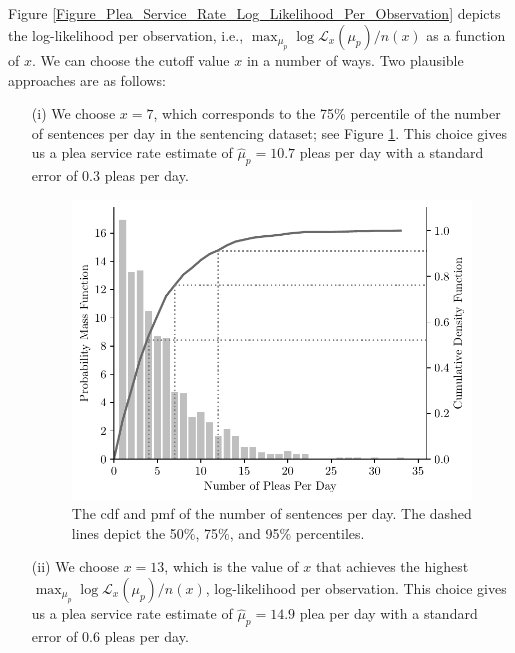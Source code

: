 \documentclass[11pt, oneside]{article}   	%
\theoremstyle{ModifiedStyle}
\begin{document}
%
Figure \ref{Figure_Plea_Service_Rate_Log_Likelihood_Per_Observation} depicts the log-likelihood per observation, i.e., $\max_{\mu_p} \log \mathcal{L}_x(\mu_p)/n(x)$ as a function of $x$. We can choose the cutoff value $x$ in a number of ways. Two plausible approaches are as follows:
\begin{itemize}
	\vspace{-1mm}
	\item[(i)] We choose $x = 7$, which corresponds to the 75\% percentile of the number of sentences per day in the sentencing dataset; see Figure \ref{Figure_Sentences_Per_Day_Histogram}. This choice gives us a plea service rate estimate of $\hat{\mu}_p = 10.7$ pleas per day with a standard error of $0.3$ pleas per day.
	\vspace{-1mm}
	\begin{figure}[H]
		\centering
		\includegraphics[scale=0.75]{Figures/Histogram_Pleas_Per_Day}
		\vspace{-2mm}
		\caption{The cdf and pmf of the number of sentences per day. The dashed lines depict the 50\%, 75\%, and 95\% percentiles.}
		\label{Figure_Sentences_Per_Day_Histogram}
	\end{figure}
	\item[(ii)] We choose $x = 13$, which is the value of $x$ that achieves the highest $\max_{\mu_p} \log \mathcal{L}_x(\mu_p)/n(x)$, log-likelihood per observation. This choice gives us a plea service rate estimate of $\hat{\mu}_p = 14.9$ plea per day with a standard error of $0.6$ pleas per day.
\end{itemize}
%
\end{document}
